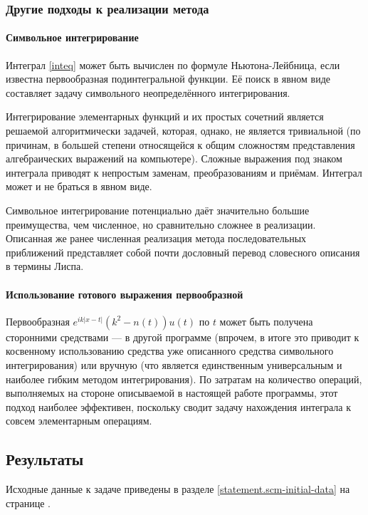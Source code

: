 \documentclass{article}
\providecommand{\abs}[1]{\left \lvert{#1}\right \rvert}
\numberwithin{equation}{section}
\begin{document}
\subsubsection{Другие подходы к реализации метода}

\paragraph{Символьное интегрирование}

Интеграл \eqref{inteq} может быть вычислен по формуле
Ньютона-Лейбница, если известна первообразная подинтегральной
функции. Её поиск в явном виде составляет задачу символьного
неопределённого интегрирования.

Интегрирование элементарных функций и их простых сочетний является
решаемой алгоритмически задачей, которая, однако, не является
тривиальной (по причинам, в большей степени относящейся к общим
сложностям представления алгебраических выражений на
компьютере). Сложные выражения под знаком интеграла приводят к
непростым заменам, преобразованиям и приёмам. Интеграл может и не
браться в явном виде.

Символьное интегрирование потенциально даёт значительно большие
преимущества, чем численное, но сравнительно сложнее в
реализации. Описанная же ранее численная реализация метода
последовательных приближений представляет собой почти дословный
перевод словесного описания в термины Лиспа.

\paragraph{Использование готового выражения первообразной}

Первообразная $e^{ik\abs{x-t}}(k^2-n(t))u(t)$ по $t$ может быть
получена сторонними средствами — в другой программе (впрочем, в итоге
это приводит к косвенному использованию средства уже описанного
средства символьного интегрирования) или вручную (что является
единственным универсальным и наиболее гибким методом
интегрирования). По затратам на количество операций, выполняемых на
стороне описываемой в настоящей работе программы, этот подход наиболее
эффективен, поскольку сводит задачу нахождения интеграла к совсем
элементарным операциям.

\clearpage
\subsection{Результаты}

Исходные данные к задаче приведены в разделе
\ref{statement.scm-initial-data} на странице
\pageref{statement.scm-initial-data}.
\end{document}
